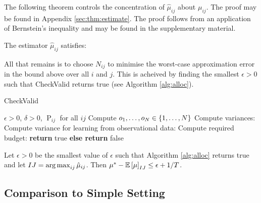 The following theorem controls the concentration of $\hat \mu_{ij}$ about $\mu_{ij}$. 
\ifsup
The proof may be found in Appendix \ref{sec:thm:estimate}.
\else
The proof follows from an application of Bernstein's inequality and may be found in the supplementary material.
\fi

\begin{theorem}\label{thm:estimate}
The estimator $\hat \mu_{ij}$ satisfies:
\end{theorem}


All that remains is to choose $N_{ij}$ to minimise the worst-case approximation error in the bound above over all $i$ and $j$.
This is acheived by finding the smallest $\epsilon > 0$ such that {\sc CheckValid} returns true (see Algorithm \ref{alg:alloc}).

\begin{algorithm}[H]
\caption{CheckValid}\label{alg:alloc}
\begin{algorithmic}
 $\epsilon > 0$, $\delta > 0$, $\operatorname P_{ij}$ for all $ij$
\STATE Compute $o_1,\ldots,o_N \in \left\{1,\ldots,N\right\}$
\STATE Compute variances:
\STATE Compute variance for learning from observational data:
\STATE Compute required budget: 
\ENDFOR
{} {\bf return} true {\bf else return} false
\end{algorithmic}
\end{algorithm}

\begin{theorem}
Let $\epsilon > 0$ be the smallest value of $\epsilon$ such that Algorithm \ref{alg:alloc} returns true and let $IJ = \argmax_{ij} \hat \mu_{ij}$.
Then $\mu^* - \mathbb E\left[\mu\right]_{IJ} \leq \epsilon + 1/T$.
\end{theorem}


\subsection*{Comparison to Simple Setting}

